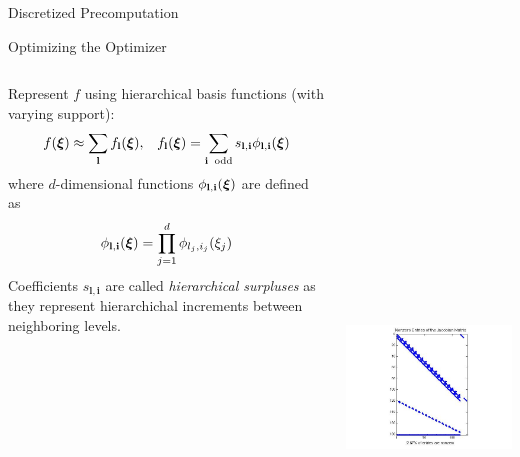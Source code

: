 \documentclass[final]{beamer}
\newcommand {\bxi} {\mbox{\boldmath $\xi$}}%
\newcommand{\bl}{\ensuremath{\mathbf{l}}} %
\newcommand{\bi}{\ensuremath{\mathbf{i}}} %
\begin{document}
\begin{frame}{}
{\begin{columns}[t]
\begin{column}{.30\linewidth}
\begin{block}{\centering Discretized Precomputation}
\end{block}
                
\begin{block}{\centering Optimizing the Optimizer}

\vspace{1em}

\begin{columns}[T]
\begin{column}{22cm}{}
Represent $f$ using hierarchical basis functions (with varying support):\\
\begin{equation*}
f(\bxi) \approx \sum\limits_{\bl} f_{\bl}(\bxi), \;\;\; f_{\bl}(\bxi) = \sum\limits_{\bi\;\;\text{odd}}  s_{\bl,\bi} \phi_{\bl,\bi}(\bxi)
\end{equation*}
\noindent
where $d$-dimensional functions $\phi_{\bl,\bi}(\bxi)$ are defined as
\begin{equation*}
\phi_{\bl,\bi}(\bxi) = \prod_{j=1}^d \phi_{l_j,i_j}(\xi_j)
\end{equation*}
Coefficients $s_{\bl,\bi}$ are called \textit{hierarchical surpluses} as they represent hierarchichal increments between neighboring levels.
\end{column}
\begin{column}{12cm}{}
\centering\includegraphics[height=16cm, width = 10cm]{figures/Spy_Jacobian.jpg} \\

\end{column}
\end{columns}
\end{block}
\end{column}
\end{columns}}
\end{frame}
\end{document}
